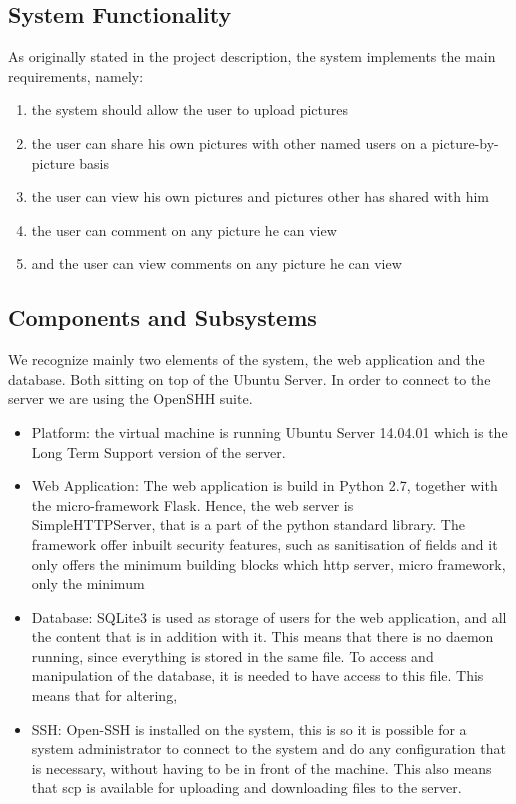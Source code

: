 \documentclass{article}
\begin{document}
\subsection{System Functionality}

As originally stated in the project description, the system implements the main requirements, namely:

\begin{enumerate}
\item the system should allow the user to upload pictures 
\item the user can share his own pictures with other named users on a picture-by-picture basis
\item the user can view his own pictures and pictures other has shared with him
\item the user can comment on any picture he can view
\item and the user can view comments on any picture he can view  
\end{enumerate}



\subsection{Components and Subsystems}

We recognize mainly two elements of the system, the web application  and the database. Both sitting on top of the Ubuntu Server. In order to connect to the server we are using the OpenSHH suite.
  
\begin{itemize}
\item Platform: the virtual machine is running Ubuntu Server 14.04.01 which is the Long Term Support version of the server.


\item Web Application: The web application is build in Python 2.7, together with the micro-framework Flask. Hence, the web server is \\SimpleHTTPServer, that is a part of the python standard library. The framework offer inbuilt security features, such as sanitisation of fields and it only offers the minimum building blocks which http server, micro framework, only the minimum 

\item Database: SQLite3 is used as storage of users for the web application, and all the content that is in addition with it. This means that there is no daemon running, since everything is stored in the same file. To access and manipulation of the database, it is needed to have access to this file. This means that for altering, 
\end{itemize}
\begin{itemize}



\item SSH: Open-SSH is installed on the system, this is so it is possible for a system administrator to connect to the system and do any configuration that is necessary, without having to be in front of the machine. This also means that scp is available for uploading and downloading files to the server. 
\end{itemize}
\end{document}
